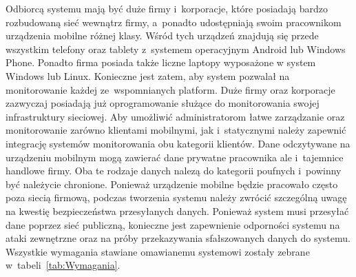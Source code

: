 Odbiorcą systemu mają być duże firmy i~korporacje, które posiadają
bardzo rozbudowaną sieć wewnątrz firmy, a~ponadto udostępniają swoim
pracownikom urządzenia mobilne różnej klasy. Wśród tych urządzeń
znajdują się przede wszystkim telefony oraz tablety z~systemem
operacyjnym Android lub Windows Phone. Ponadto firma posiada także
liczne laptopy wyposażone w system Windows lub Linux. Konieczne jest
zatem, aby system pozwalał na monitorowanie każdej ze~wspomnianych
platform. Duże firmy oraz korporacje zazwyczaj posiadają już
oprogramowanie służące do monitorowania swojej infrastruktury
sieciowej. Aby umożliwić administratorom łatwe zarządzanie oraz
monitorowanie zarówno klientami mobilnymi, jak i~statycznymi należy
zapewnić integrację systemów monitorowania obu kategorii
klientów. Dane odczytywane na urządzeniu mobilnym mogą zawierać dane
prywatne pracownika ale i~tajemnice handlowe firmy. Oba te rodzaje
danych nalezą do kategorii poufnych i~powinny być należycie
chronione. Ponieważ urządzenie mobilne będzie pracowało często poza
siecią firmową, podczas tworzenia systemu należy zwrócić szczególną
uwagę na kwestię bezpieczeństwa przesyłanych danych. Ponieważ system
musi przesyłać dane poprzez sieć publiczną, konieczne jest zapewnienie
odporności systemu na ataki zewnętrzne oraz na próby przekazywania
sfałszowanych danych do systemu. Wszystkie wymagania stawiane
omawianemu systemowi zostały zebrane w~tabeli~\ref{tab:Wymagania}.

